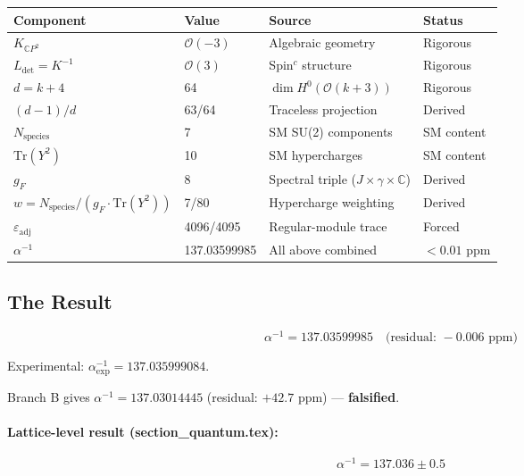 \documentclass[11pt]{article}
\begin{document}
\begin{center}
\begin{tabular}{llll}
\toprule
Component & Value & Source & Status \\
\midrule
$K_{\mathbb{C}P^2}$ & $\mathcal{O}(-3)$ & Algebraic geometry & Rigorous \\
$L_{\det} = K^{-1}$ & $\mathcal{O}(3)$ & Spin$^c$ structure & Rigorous \\
$d = k + 4$ & 64 & $\dim H^0(\mathcal{O}(k+3))$ & Rigorous \\
$(d-1)/d$ & 63/64 & Traceless projection & Derived \\
$N_{\mathrm{species}}$ & 7 & SM SU(2) components & SM content \\
$\mathrm{Tr}(Y^2)$ & 10 & SM hypercharges & SM content \\
$g_F$ & 8 & Spectral triple ($J \times \gamma \times \mathbb{C}$) & Derived \\
$w = N_{\mathrm{species}}/(g_F \cdot \mathrm{Tr}(Y^2))$ & 7/80 & Hypercharge weighting & Derived \\
$\varepsilon_{\mathrm{adj}}$ & 4096/4095 & Regular-module trace & Forced \\
\midrule
$\alpha^{-1}$ & 137.03599985 & All above combined & $< 0.01$ ppm \\
\bottomrule
\end{tabular}
\end{center}

\subsection{The Result}

\begin{tcolorbox}[colback=green!5!white, colframe=green!50!black, title=Convention-Locked Result]
\begin{equation}\tag{RESULT-1}
\boxed{\alpha^{-1} = 137.03599985 \quad \text{(residual: } -0.006\text{ ppm)}}
\end{equation}

Experimental: $\alpha^{-1}_{\mathrm{exp}} = 137.035999084$.

Branch B gives $\alpha^{-1} = 137.03014445$ (residual: $+42.7$ ppm) --- \textbf{falsified}.
\end{tcolorbox}

\paragraph{Lattice-level result (section\_quantum.tex):}
\begin{equation}\tag{RESULT-2}
\boxed{\alpha^{-1} = 137.036 \pm 0.5}
\end{equation}
\end{document}
